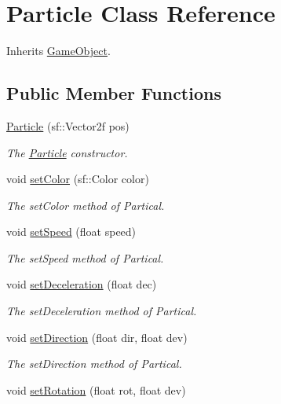\hypertarget{class_particle}{\section{Particle Class Reference}
\label{class_particle}
}


Inherits \hyperlink{class_game_object}{Game\+Object}.

\subsection*{Public Member Functions}
\begin{DoxyCompactItemize}
\item 
\hyperlink{class_particle_aeb1cb89169a8cd1ebdf9620e6f2f6566}{Particle} (sf\+::\+Vector2f pos)
\begin{DoxyCompactList}\small\item\em The \hyperlink{class_particle}{Particle} constructor. \end{DoxyCompactList}\item 
void \hyperlink{class_particle_ad7dcfb0c3c1b11d35d321b7918bd546f}{set\+Color} (sf\+::\+Color color)
\begin{DoxyCompactList}\small\item\em The set\+Color method of Partical. \end{DoxyCompactList}\item 
void \hyperlink{class_particle_ac57a8908b8ab1a1b9bb29aa02e347f56}{set\+Speed} (float speed)
\begin{DoxyCompactList}\small\item\em The set\+Speed method of Partical. \end{DoxyCompactList}\item 
void \hyperlink{class_particle_a87a76728e3b91795c52beb9257e7e9df}{set\+Deceleration} (float dec)
\begin{DoxyCompactList}\small\item\em The set\+Deceleration method of Partical. \end{DoxyCompactList}\item 
void \hyperlink{class_particle_a2e6c588a1cb9607ef70f3d97edefd780}{set\+Direction} (float dir, float dev)
\begin{DoxyCompactList}\small\item\em The set\+Direction method of Partical. \end{DoxyCompactList}\item 
void \hyperlink{class_particle_a8472fac4770b3d198426e480ccef97d5}{set\+Rotation} (float rot, float dev)

\end{DoxyCompactItemize}
